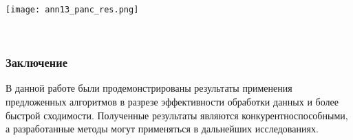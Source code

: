 \begin{minipage}{1.0\linewidth}
    \begin{center}
        \texttt{[image: ann13\_panc\_res.png]} \\
    \end{center}
\end{minipage} \\
\subsubsection*{Заключение}
В данной работе были продемонстрированы результаты применения предложенных 
алгоритмов в разрезе эффективности обработки данных и более быстрой сходимости.
Полученные результаты являются конкурентноспособными, а разработанные 
методы могут применяться в дальнейших исследованиях.